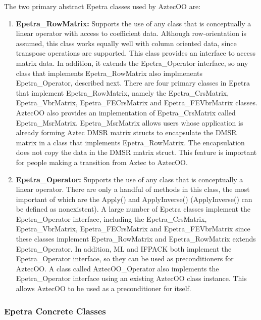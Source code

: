 \documentclass[12pt,relax]{AztecOOUserGuide}
\newcommand{\crsmatrix}{Epetra\_CrsMatrix}
\newcommand{\vbrmatrix}{Epetra\_VbrMatrix}
\newcommand{\rowmatrix}{Epetra\_RowMatrix}
\newcommand{\operator}{Epetra\_Operator}
\newcommand{\fecrsmatrix}{Epetra\_FECrsMatrix}
\newcommand{\fevbrmatrix}{Epetra\_FEVbrMatrix}
\newcommand{\msrmatrix}{Epetra\_MsrMatrix}
\newcommand{\oooperator}{AztecOO\_Operator}
\begin{document}
The two primary abstract Epetra classes used by AztecOO are:
\begin{enumerate}
\item {\bf \rowmatrix{}: } Supports the use of any class that is
conceptually a linear operator with access to coefficient data.
Although row-orientation is assumed, this class works equally well
with column oriented data, since transpose operations are supported.  
This class provides an interface to access matrix data.  In addition,
it extends the \operator{} interface, so any class that implements
\rowmatrix{} also implmenents \operator{}, described next.  There are
four primary classes in Epetra that implement \rowmatrix{}, namely 
the \crsmatrix{}, \vbrmatrix{}, \fecrsmatrix{} and \fevbrmatrix{}
classes.  AztecOO also provides an implementation of \crsmatrix{}
called \msrmatrix{}.  \msrmatrix{} allows users whose application is
already forming Aztec DMSR matrix structs to encapsulate the DMSR
matrix in a class that implements \rowmatrix.  The encapsulation does
not copy the data in the DMSR matrix struct.  This feature is
important for people making a transition from Aztec to AztecOO.
\item {\bf \operator{}: } Supports the use of any class that is
conceptually a linear operator.  There are only a handful of methods
in this class, the most important of which are the Apply() and
ApplyInverse() (ApplyInverse() can be defined as nonexistent).  
A large number of Epetra classes implement the
\operator{} interface, including the \crsmatrix{}, \vbrmatrix{},
\fecrsmatrix{} and \fevbrmatrix{} since these classes implement
\rowmatrix{} and \rowmatrix{} extends \operator{}.  In addition, ML
and IFPACK both implement the \operator{} interface, so they can be
used as preconditioners for AztecOO.  A class called \oooperator{}
also implements the \operator{} interface using an existing AztecOO
class instance.  This allows AztecOO to be used as a preconditioner
for itself.

\end{enumerate}

\subsubsection{Epetra Concrete Classes}
\end{document}
